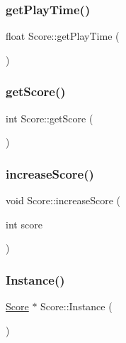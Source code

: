 \mbox{\label{class_score_ae4fc66274baac2f13975f6139681b52c}} 
\subsubsection{\texorpdfstring{get\+Play\+Time()}{getPlayTime()}}
{\footnotesize\ttfamily float Score\+::get\+Play\+Time (\begin{DoxyParamCaption}{ }\end{DoxyParamCaption})}

\mbox{\label{class_score_a8627c93270c188a3fd28a25b1d07a9e7}} 
\subsubsection{\texorpdfstring{get\+Score()}{getScore()}}
{\footnotesize\ttfamily int Score\+::get\+Score (\begin{DoxyParamCaption}{ }\end{DoxyParamCaption})}

\mbox{\label{class_score_a9be80e91f6252cbb7c59d5212280e00f}} 
\subsubsection{\texorpdfstring{increase\+Score()}{increaseScore()}}
{\footnotesize\ttfamily void Score\+::increase\+Score (\begin{DoxyParamCaption}\item[{int}]{score }\end{DoxyParamCaption})}

\mbox{\label{class_score_a7d5516454642a247be184d5063404d04}} 
\subsubsection{\texorpdfstring{Instance()}{Instance()}}
{\footnotesize\ttfamily \hyperlink{class_score}{Score} $\ast$ Score\+::\+Instance (\begin{DoxyParamCaption}{ }\end{DoxyParamCaption})\hspace{0.3cm}{\ttfamily [static]}}

